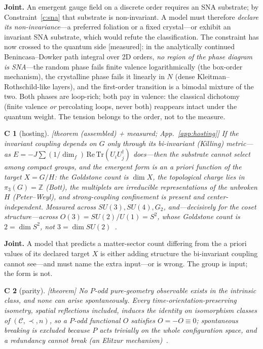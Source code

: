 \documentclass[aps,prd,reprint,nofootinbib,superscriptaddress,floatfix]{revtex4-2}
\newtheorem{constraint}{C}
\begin{document}
\noindent\textbf{Joint.} An emergent gauge field on a discrete order requires an SNA
substrate; by Constraint~\ref{c:sna} that substrate is non-invariant. A model must
therefore \emph{declare its non-invariance}---a preferred foliation or a fixed
crystal---or exhibit an invariant SNA substrate, which would refute the classification.
The constraint has now crossed to the quantum side [measured]: in the analytically
continued Benincasa--Dowker path integral over 2D orders, \emph{no region of the phase
diagram is SNA}---the random phase fails finite valence logarithmically (the box-order
mechanism), the crystalline phase fails it linearly in $N$ (dense Kleitman--Rothschild-like
layers), and the first-order transition is a bimodal mixture of the two. Both phases are
loop-rich; both pay in valence: the classical dichotomy (finite valence \emph{or}
percolating loops, never both) reappears intact under the quantum weight. The tension
belongs to the order, not to the measure.

\begin{constraint}[hosting]
\label{c:hosting}
{\rm[theorem (assembled) + measured; App.~\ref{app:hosting}]} If the invariant coupling depends on $G$ only through
its bi-invariant (Killing) metric---as $E=-J\sum(1/\dim_f)\,\mathrm{Re}\,\mathrm{Tr}
(U_iU_j^\dagger)$ does---then the substrate cannot select among compact groups, and the
emergent \emph{form} is an a priori function of the target $X=G/H$: the Goldstone count is
$\dim X$, the topological charge lies in $\pi_3(G)=\mathbb Z$ (Bott), the multiplets are
irreducible representations of the unbroken $H$ (Peter--Weyl), and strong-coupling
confinement is present and \emph{center-independent}. Measured across $SU(3),SU(4),G_2$,
and---decisively for the coset structure---across $O(3)=SU(2)/U(1)=S^2$, whose Goldstone
count is $2=\dim S^2$, not $3=\dim SU(2)$~\cite{SU3PRD,MatterGravityPRD}.
\end{constraint}

\noindent\textbf{Joint.} A model that predicts a matter-sector count differing from the a
priori values of its declared target $X$ is either adding structure the bi-invariant coupling
cannot see---and must name the extra input---or is wrong. The group is input; the form is not.

\begin{constraint}[parity]
\label{c:parity}
{\rm[theorem]} No $P$-odd pure-geometry observable exists in the intrinsic class, and none
can arise spontaneously. Every time-orientation-preserving isometry, spatial reflections
included, induces the identity on isomorphism classes of $(\mathcal C,\prec,n)$, so a
$P$-odd functional $O$ satisfies $O=-O\equiv0$; spontaneous breaking is excluded because $P$
acts trivially on the whole configuration space, and a redundancy cannot break (an Elitzur
mechanism)~\cite{CorePaper}.
\end{constraint}
\end{document}
